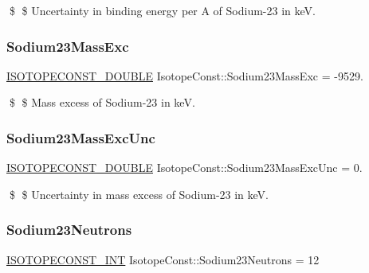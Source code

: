 \$ \$ Uncertainty in binding energy per A of Sodium-\/23 in keV. \mbox{\label{group___isotope_const-_sodium-_na23_ga394edc4658715d3566d15e02df13d5b2}} 
\subsubsection{\texorpdfstring{Sodium23\+Mass\+Exc}{Sodium23MassExc}}
{\footnotesize\ttfamily \mbox{\hyperlink{group___isotope_const-_macros_ga8f45a7272ce02c0b4c65c44636ed719a}{I\+S\+O\+T\+O\+P\+E\+C\+O\+N\+S\+T\+\_\+\+D\+O\+U\+B\+LE}} Isotope\+Const\+::\+Sodium23\+Mass\+Exc = -\/9529.}

\$ \$ Mass excess of Sodium-\/23 in keV. \mbox{\label{group___isotope_const-_sodium-_na23_ga1beff2837ae0122085d938879932ef8d}} 
\subsubsection{\texorpdfstring{Sodium23\+Mass\+Exc\+Unc}{Sodium23MassExcUnc}}
{\footnotesize\ttfamily \mbox{\hyperlink{group___isotope_const-_macros_ga8f45a7272ce02c0b4c65c44636ed719a}{I\+S\+O\+T\+O\+P\+E\+C\+O\+N\+S\+T\+\_\+\+D\+O\+U\+B\+LE}} Isotope\+Const\+::\+Sodium23\+Mass\+Exc\+Unc = 0.}

\$ \$ Uncertainty in mass excess of Sodium-\/23 in keV. \mbox{\label{group___isotope_const-_sodium-_na23_gac270bc8877dc8661af71f088533ab946}} 
\subsubsection{\texorpdfstring{Sodium23\+Neutrons}{Sodium23Neutrons}}
{\footnotesize\ttfamily \mbox{\hyperlink{group___isotope_const-_macros_ga5f18360b3e99483a35c32d789e62621c}{I\+S\+O\+T\+O\+P\+E\+C\+O\+N\+S\+T\+\_\+\+I\+NT}} Isotope\+Const\+::\+Sodium23\+Neutrons = 12}

